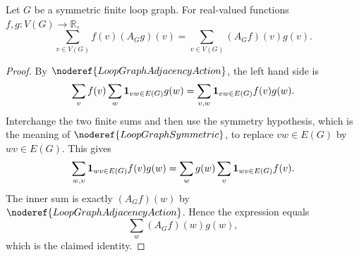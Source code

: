 \begin{helper}
Let \(G\) be a symmetric finite loop graph. For real-valued functions \(f,g\colon V(G)\to\mathbb R\),
\[
  \sum_{v\in V(G)} f(v)(A_Gg)(v)
  =
  \sum_{v\in V(G)} (A_Gf)(v)g(v).
\]
\end{helper}
\begin{proof}
By \(\noderef{LoopGraphAdjacencyAction}\), the left hand side is
\[
  \sum_v f(v)\sum_w {\bf 1}_{vw\in E(G)}g(w)
  =
  \sum_{v,w}{\bf 1}_{vw\in E(G)}f(v)g(w).
\]
Interchange the two finite sums and then use the symmetry hypothesis, which is the meaning of \(\noderef{LoopGraphSymmetric}\), to replace \(vw\in E(G)\) by \(wv\in E(G)\). This gives
\[
  \sum_{w,v}{\bf 1}_{wv\in E(G)}f(v)g(w)
  =
  \sum_w g(w)\sum_v {\bf 1}_{wv\in E(G)}f(v).
\]
The inner sum is exactly \((A_Gf)(w)\) by \(\noderef{LoopGraphAdjacencyAction}\). Hence the expression equals
\[
  \sum_w (A_Gf)(w)g(w),
\]
which is the claimed identity.
\end{proof}
